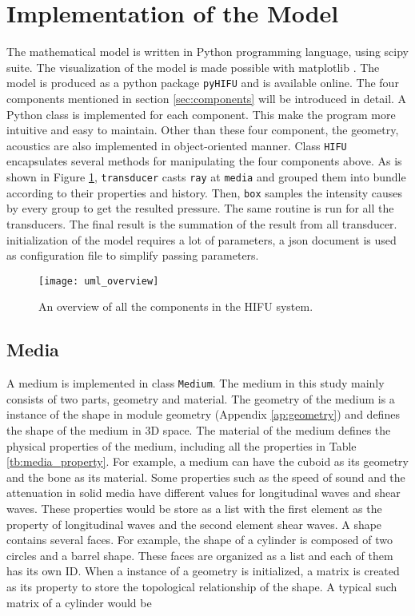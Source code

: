 \section{Implementation of the Model} \label{sec:implement}
The mathematical model is written in Python programming language, using scipy suite\cite{scipy}. The visualization of the model is made possible with matplotlib \cite{matplotlib}. The model is produced as a python package \texttt{pyHIFU} and is available online. The four components mentioned in section \ref{sec:components} will be introduced in detail. A Python class is implemented for each component. This make the program more intuitive and easy to maintain. Other than these four component, the geometry, acoustics are also implemented in object-oriented manner. Class \texttt{HIFU} encapsulates several methods for manipulating the four components above. As is shown in Figure \ref{fig:uml_overview}, \texttt{transducer} casts \texttt{ray} at \texttt{media} and grouped them into bundle according to their properties and history. Then, \texttt{box} samples the intensity causes by every group to get the resulted pressure. The same routine is run for all the transducers. The final result is the summation of the result from all transducer.
initialization of the model requires a lot of parameters, a json document is used as configuration file to simplify passing parameters.

\begin{figure}[h]
    \centering
    \texttt{[image: uml\_overview]}
    \caption{An overview of all the components in the HIFU system.}
    \label{fig:uml_overview}
\end{figure}

\subsection{Media} \label{sec:Media}
A medium is implemented in class \texttt{Medium}. The medium in this study mainly consists of two parts, geometry and material. The geometry of the medium is a instance of the shape in module geometry (Appendix \ref{ap:geometry}) and defines the shape of the medium in 3D space. The material of the medium defines the physical properties of the medium, including all the properties in Table \ref{tb:media_property}. For example, a medium can have the cuboid as its geometry and the bone as its material. Some properties such as the speed of sound and the attenuation in solid media have different values for longitudinal waves and shear waves. These properties would be store as a list with the first element as the property of longitudinal waves and the second element shear waves. A shape contains several faces. For example, the shape of a cylinder is composed of two circles and a barrel shape. These faces are organized as a list and each of them has its own ID. When a instance of a geometry is initialized, a matrix is created as its property to store the topological relationship of the shape. A typical such matrix of a cylinder would be

